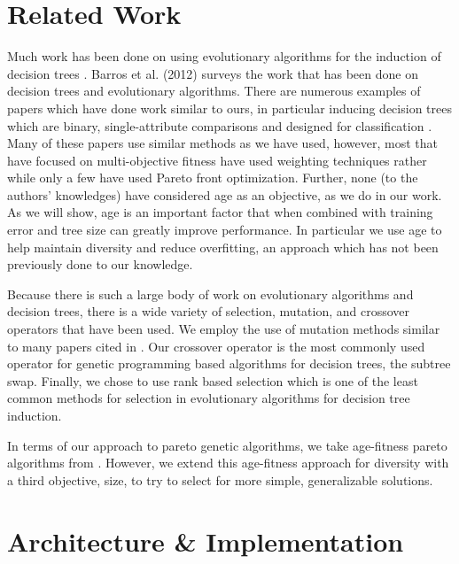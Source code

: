 \documentclass{acm_proc_article-sp}
\begin{document}
\section{Related Work}

Much work has been done on using evolutionary algorithms for the induction of decision trees \cite{barros2012}. Barros et al. (2012) surveys the work that has been done on decision trees and evolutionary algorithms. There are numerous examples of papers which have done work similar to ours, in particular inducing decision trees which are binary, single-attribute comparisons and designed for classification \cite{barros2012}. Many of these papers use similar methods as we have used, however, most that have focused on multi-objective fitness have used weighting techniques rather while only a few have used Pareto front optimization. Further, none (to the authors' knowledges) have considered age as an objective, as we do in our work. As we will show, age is an important factor that when combined with training error and tree size can greatly improve performance. In particular we use age to help maintain diversity and reduce overfitting, an approach which has not been previously done to our knowledge.

Because there is such a large body of work on evolutionary algorithms and decision trees, there is a wide variety of selection, mutation, and crossover operators that have been used. We employ the use of mutation methods similar to many papers cited in \cite{barros2012}. Our crossover operator is the most commonly used operator for genetic programming based algorithms for decision trees, the subtree swap. Finally, we chose to use rank based selection which is one of the least common methods for selection in evolutionary algorithms for decision tree induction.

In terms of our approach to pareto genetic algorithms, we take age-fitness pareto algorithms from \cite{schmidt2011}. However, we extend this age-fitness approach for diversity with a third objective, size, to try to select for more simple, generalizable solutions.

\section{Architecture \& Implementation}
\end{document}
